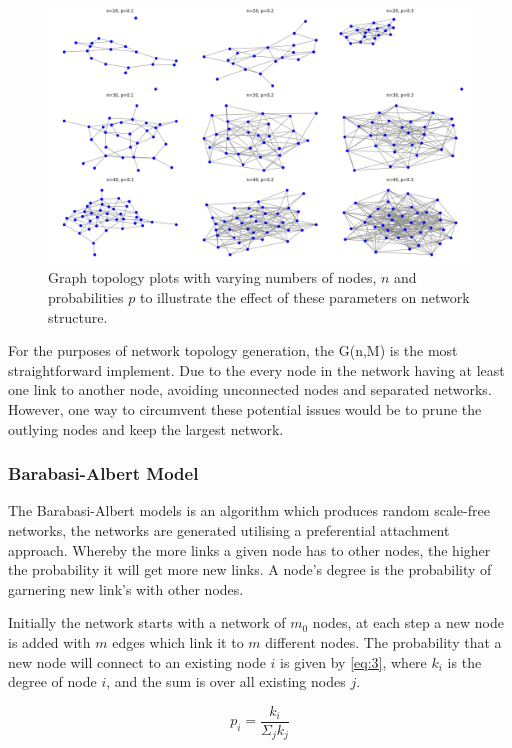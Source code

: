 \begin{figure}
    \centering
    \includegraphics[width=0.75\linewidth]{images/ER/20,30,40.png}
    \caption{Graph topology plots with varying numbers of nodes, $n$ and probabilities $p$ to illustrate the effect of these parameters on network structure.}
    \label{fig:20,30,40}
\end{figure}

For the purposes of network topology generation, the G(n,M) is the most straightforward implement. Due to the every node in the network having at least one link to another node, avoiding unconnected nodes and separated networks. However, one way to circumvent these potential issues would be to prune the outlying nodes and keep the largest network. 

\subsubsection{Barabasi-Albert Model}

The Barabasi-Albert models is an algorithm which  produces random scale-free networks, the networks are generated utilising a preferential attachment approach. Whereby the more links a given node has to other nodes, the higher the probability it will get more new links. A node's degree is the probability of garnering new link's with other nodes.

Initially the network starts with a network of $m_0$ nodes, at each step a new node is added with $m$ edges which link it to $m$ different nodes. The probability that a new node will connect to an existing node $i$ is given by \ref{eq:3}, where $k_i$ is the degree of node $i$, and the sum is over all existing nodes $j$. \cite{Albert_barabasi_2002} 


\begin{equation} \label{eq:3}
    p_i = \frac{k_i}{\Sigma_jk_j}
\end{equation}

